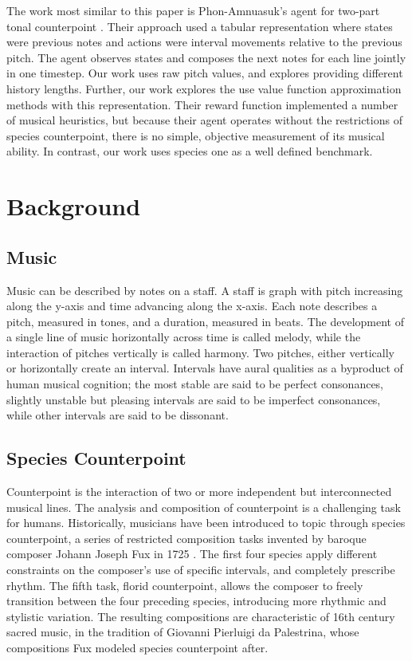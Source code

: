 \documentclass{article}
\begin{document}
	The work most similar to this paper is Phon-Amnuasuk's agent for two-part tonal counterpoint \cite{Phon-Amnuaisuk2009}. Their approach used a tabular representation where states were previous notes and actions were interval movements relative to the previous pitch. The agent observes states and composes the next notes for each line jointly in one timestep. Our work uses raw pitch values, and explores providing different history lengths. Further, our work explores the use value function approximation methods with this representation. Their reward function implemented a number of musical heuristics, but because their agent operates without the restrictions of species counterpoint, there is no simple, objective measurement of its musical ability. In contrast, our work uses species one as a well defined benchmark. 

	\section{Background}
    \subsection{Music}
    Music can be described by notes on a staff. A staff is graph with pitch increasing along the y-axis and time advancing along the x-axis. Each note describes a pitch, measured in tones, and a duration, measured in beats. The development of a single line of music horizontally across time is called melody, while the interaction of pitches vertically is called harmony. Two pitches, either vertically or horizontally create an interval. Intervals have aural qualities as a byproduct of human musical cognition; the most stable are said to be perfect consonances, slightly unstable but pleasing intervals are said to be imperfect consonances, while other intervals are said to be dissonant.
    
    \subsection{Species Counterpoint}
    
    Counterpoint is the interaction of two or more independent but interconnected musical lines. The analysis and composition of counterpoint is a challenging task for humans. Historically, musicians have been introduced to topic through species counterpoint, a series of restricted composition tasks invented by baroque composer Johann Joseph Fux in 1725 \cite{Davidian2015}. The first four species apply different constraints on the composer's use of specific intervals, and completely prescribe rhythm. The fifth task, florid counterpoint, allows the composer to freely transition between the four preceding species, introducing more rhythmic and stylistic variation. The resulting compositions are characteristic of 16th century sacred music, in the tradition of Giovanni Pierluigi da Palestrina, whose compositions Fux modeled species counterpoint after.
    
\end{document}
